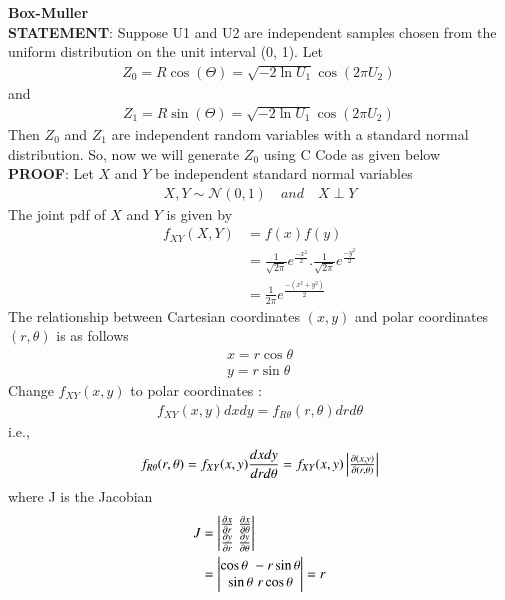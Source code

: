 \documentclass[article]{IEEEtran}
\theoremstyle{remark}
\begin{document}
\newpage
\textbf{Box-Muller}\\
\textbf{STATEMENT}:
  Suppose U1 and U2 are independent samples chosen from the uniform distribution on the unit interval (0, 1). Let
  \begin{align}
  	Z_0 = R \cos(\Theta) =\sqrt{-2 \ln U_1} \cos(2 \pi U_2)\,
  \end{align}
   and
  \begin{align}
  	Z_1 = R \sin(\Theta) =\sqrt{-2 \ln U_1} \cos(2 \pi U_2)\, 
  \end{align}
  Then $Z_0$ and $Z_1$ are independent random variables with a standard normal distribution.
  So, now we will generate $Z_0$ using C Code as given below \\
\textbf{PROOF}:
  Let $X$ and $Y$ be independent standard normal variables 
  \begin{align}
  	X,Y \sim \mathcal{N}(0,1) \quad and \quad X\perp Y
  \end{align}
  The joint pdf of $X$ and $Y$ is given by 
  \begin{align}
  	f_{XY}(X,Y) &= f(x)f(y)\\
  	&= \frac{1}{\sqrt{2\pi}}e^{\frac{-x^2}{2}}.\frac{1}{\sqrt{2\pi}}e^{\frac{-y^2}{2}}\\
  	&= \frac{1}{2\pi}e^{\frac{-(x^2+y^2)}{2}}
  \end{align}
  The relationship between Cartesian coordinates $(x,y)$ and polar coordinates $(r,\theta)$ is as follows 
  \begin{align}
  	x=r\cos\theta \\
  	y=r\sin\theta
  \end{align}
  Change $f_{XY}(x,y)$ to polar coordinates :
  \begin{align}
  	f_{XY}(x,y) dxdy = f_{R\theta}(r,\theta) drd\theta
  \end{align}
  i.e.,
  \begin{align}
  	f_{R\theta}(r,\theta) = f_{XY}(x,y) \frac{dxdy}{drd\theta}
  	= f_{XY}(x,y) \begin{vmatrix}\frac{\partial(x,y)}{\partial(r,\theta)}\end{vmatrix}
  \end{align}
  where J is the Jacobian 
  \begin{align}
  	J &= \begin{vmatrix}\frac{\partial x}{\partial r} \,\, \frac{\partial x}{\partial \theta}\\\frac{\partial y}{\partial r} \,\, \frac{\partial y}{\partial \theta}\end{vmatrix}\\
  	&= \begin{vmatrix}\cos\theta \,\, -r\sin\theta \\ \sin\theta \,\, r\cos\theta\end{vmatrix} = r
  \end{align}
\end{document}
